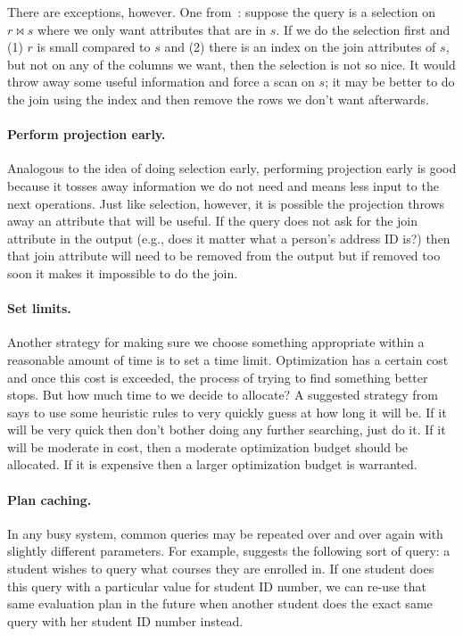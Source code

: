 There are exceptions, however. One from~\cite{dsc}: suppose the query is a selection on $r \bowtie s$ where we only want attributes that are in $s$. If we do the selection first and (1) $r$ is small compared to $s$ and (2) there is an index on the join attributes of $s$, but not on any of the columns we want, then the selection is not so nice. It would throw away some useful information and force a scan on $s$; it may be better to do the join using the index and then remove the rows we don't want afterwards.

\paragraph{Perform projection early.} Analogous to the idea of doing selection early, performing projection early is good because it tosses away information we do not need and means less input to the next operations. Just like selection, however, it is possible the projection throws away an attribute that will be useful. If the query does not ask for the join attribute in the output (e.g., does it matter what a person's address ID is?) then that join attribute will need to be removed from the output but if removed too soon it makes it impossible to do the join.

\paragraph{Set limits.} Another strategy for making sure we choose something appropriate within a reasonable amount of time is to set a time limit. Optimization has a certain cost and once this cost is exceeded, the process of trying to find something better stops. But how much time to we decide to allocate? A suggested strategy from~\cite{dsc} says to use some heuristic rules to very quickly guess at how long it will be. If it will be very quick then don't bother doing any further searching, just do it. If it will be moderate in cost, then a moderate optimization budget should be allocated. If it is expensive then a larger optimization budget is warranted.

\paragraph{Plan caching.} In any busy system, common queries may be repeated over and over again with slightly different parameters. For example, \cite{dsc} suggests the following sort of query: a student wishes to query what courses they are enrolled in. If one student does this query with a particular value for student ID number, we can re-use that same evaluation plan in the future when another student does the exact same query with her student ID number instead. 

